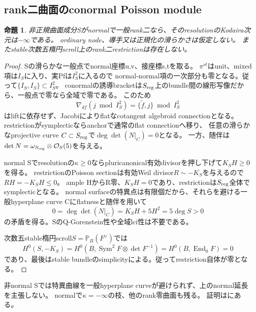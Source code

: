 \documentclass[a4paper,11pt]{ltjsarticle}
\newtheorem{proposition}{命題}[section]
\theoremstyle{definition}
\begin{document}
\subsection{rank二曲面のconormal Poisson module}
\begin{proposition}\label{prop:nonnormal-rank2-module}
非正規曲面成分Sがnormalで一般rank二なら、そのresolutionのKodaira次元は$-\infty$である。
ordinary node、導手又は正規化の滑らかさは仮定しない。
またstable次数五楕円scroll上のrank二restrictionは存在しない。
\end{proposition}
\begin{proof}
Sの滑らかな一般点でnormal座標u,v、接座標s,tを取る。
$\pi^{st}$はunit、mixed項は$I_S$に入り、実Pfは$I_S^2$に入るので
normal-normal項の一次部分も零となる。従って$\{I_S,I_S\}\subset I_S^2$。
conormalの誘導bracketは$S_{\rm reg}$上のbundle間の線形写像だから、一般点で零なら全域で零である。
このため
\[
 \nabla_{df}(j\bmod I_S^2)=\{\widetilde f,j\}\bmod I_S^2
\]
はliftに依存せず、Jacobiによりflatなcotangent algebroid connectionとなる。
restrictionがsymplecticならanchorで通常のflat connectionへ移り、
任意の滑らかなprojective curve $C\subset S_{\rm reg}$で$\deg\det(N|_C)=0$となる。
一方、随伴は$\det N=\omega_{S_{\rm reg}}\otimes\mathcal O_S(5)$を与える。

normal Sでresolutionの$\kappa\ge0$ならpluricanonical有効divisorを押し下げて$K_SH\ge0$を得る。
restrictionのPoisson sectionは有効Weil divisor$R\sim-K_S$を与えるので$RH=-K_SH\le0$。
ample HからR零、$K_SH=0$であり、restrictionは$S_{\rm reg}$全体でsymplecticとなる。
normal surfaceの特異点は有限個だから、それらを避ける一般hyperplane curve Cにflatnessと随伴を用いて
\[
 0=\deg\det(N|_C)=K_SH+5H^2=5\deg S>0
\]
の矛盾を得る。SのQ-Gorenstein性や全域lci性は不要である。

次数五stable楕円scroll$S=\mathbb P_B(F^\vee)$では
\[
 H^0(S,-K_S)=H^0(B,\operatorname{Sym}^2F\otimes\det F^{-1})
     =H^0(B,\operatorname{End}_0F)=0
\]
であり、最後はstable bundleのsimplicityによる。従ってrestriction自体が零となる。
\end{proof}
非normal Sでは特異曲線を一般hyperplane curveが避けられず、上のnormal延長を主張しない。
normalで$\kappa=-\infty$の枝、他のrank零曲面も残る。
証明はにある。
\end{document}
